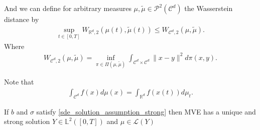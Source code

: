 \begin{definition}\label{c_d_wasserstein}
And we can define for arbitrary measures $\mu ,\tilde{\mu } \in  \mathcal{P}^2(\mathcal{C}^{d} ) $ the Wasserstein distance by
\begin{align*}
  \sup_{t \in  [0,T]} W_{\mathbb{R}^{d},2 }(\mu(t),\tilde{\mu }(t) ) \le  W_{\mathcal{C}^{d},2 } (\mu ,\tilde{\mu } )
.\end{align*}
Where 
\begin{align*}
  W_{\mathcal{C}^{d},2 }(\mu ,\tilde{\mu } ) = \inf_{\pi  \in  \Pi(\mu ,\tilde{\mu } )} \int_{\mathcal{C}^{d} \times  \mathcal{C}^{d}  } \|x-y \|^2 d\pi(x,y)
.\end{align*}
\end{definition}
\begin{remark}
 Note that
 \begin{align*}
   \int_{\mathcal{C}^{d} } f(x) d\mu(x) = \int_{\mathbb{R}^{d} }  f(x(t)) d\mu_t
 .\end{align*}
\end{remark}
\begin{theorem}\label{solution_vlasov}
  If $b$ and $\sigma $ satisfy \autoref{sde_solution_assumption_strong} then MVE has a unique and strong solution
  $Y \in  \mathbb{L}^2([0,T])$ and $\mu  \in  \mathcal{L}(Y)$
\end{theorem}

